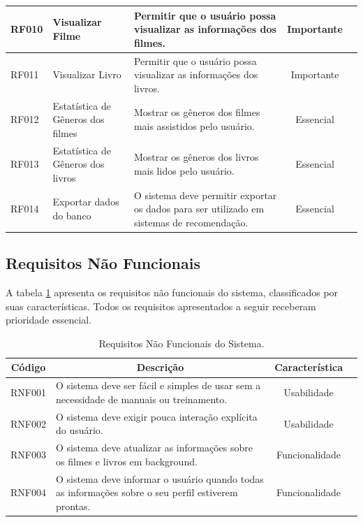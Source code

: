 \begin{table}[H]
\begin{tabular}{|m{1.2cm} | m{3cm} | m{7.2cm}| c | m{1.9cm}}
		RF010   & Visualizar Filme                       & Permitir que o usuário possa visualizar as informações dos filmes.                                                 & Importante      \\ \hline
		RF011   & Visualizar Livro                       & Permitir que o usuário possa visualizar as informações dos livros.                                                 & Importante      \\ \hline
		RF012   & Estatística de Gêneros dos filmes      & Mostrar os gêneros dos filmes mais assistidos pelo usuário.                                                        & Essencial       \\ \hline
		RF013   & Estatística de Gêneros dos livros      & Mostrar os gêneros dos livros mais lidos pelo usuário.                                                             & Essencial       \\ \hline
		RF014   & Exportar dados do banco                & O sistema deve permitir exportar os dados para ser utilizado em sistemas de recomendação.   						  & Essencial       \\ \hline
	\end{tabular}
\end{table}


\subsection{Requisitos Não Funcionais}

A tabela \ref{tab:req-nao-funcionais} apresenta os requisitos não funcionais do sistema, classificados por suas características. Todos os requisitos apresentados a seguir receberam prioridade essencial.

\begin{table}[H]
	\centering
	\caption{Requisitos Não Funcionais do Sistema.}
	\label{tab:req-nao-funcionais}
	\bgroup
	\def\arraystretch{1.3} %
	\begin{tabular}{| m{1.3cm} | m{9.4cm}| c | m{2cm}}
		\hline
		
		\multicolumn{1}{|c|}{\bfseries Código} & \multicolumn{1}{c|}{\bfseries Descrição} & \multicolumn{1}{c|}{\bfseries Característica} \\ \hline

		RNF001 & O sistema deve ser fácil e simples de usar sem a necessidade de manuais ou treinamento. 			& Usabilidade 		\\ \hline
		RNF002 & O sistema deve exigir pouca interação explícita do usuário. 										& Usabilidade 		\\ \hline
		RNF003 & O sistema deve atualizar as informações sobre os filmes e livros em background. 					& Funcionalidade 	\\ \hline
		RNF004 & O sistema deve informar o usuário quando todas as informações sobre o seu perfil estiverem prontas. 	& Funcionalidade	\\ \hline

	\end{tabular}
	\egroup
\end{table}


